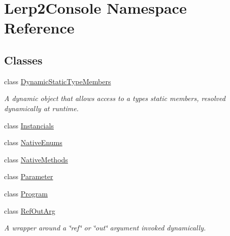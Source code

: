 \hypertarget{namespace_lerp2_console}{}\section{Lerp2\+Console Namespace Reference}
\label{namespace_lerp2_console}
\subsection*{Classes}
\begin{DoxyCompactItemize}
\item 
class \hyperlink{class_lerp2_console_1_1_dynamic_static_type_members}{Dynamic\+Static\+Type\+Members}
\begin{DoxyCompactList}\small\item\em A dynamic object that allows access to a type\textquotesingle{}s static members, resolved dynamically at runtime. \end{DoxyCompactList}\item 
class \hyperlink{class_lerp2_console_1_1_instancials}{Instancials}
\item 
class \hyperlink{class_lerp2_console_1_1_native_enums}{Native\+Enums}
\item 
class \hyperlink{class_lerp2_console_1_1_native_methods}{Native\+Methods}
\item 
class \hyperlink{class_lerp2_console_1_1_parameter}{Parameter}
\item 
class \hyperlink{class_lerp2_console_1_1_program}{Program}
\item 
class \hyperlink{class_lerp2_console_1_1_ref_out_arg}{Ref\+Out\+Arg}
\begin{DoxyCompactList}\small\item\em A wrapper around a \char`\"{}ref\char`\"{} or \char`\"{}out\char`\"{} argument invoked dynamically. \end{DoxyCompactList}\end{DoxyCompactItemize}
